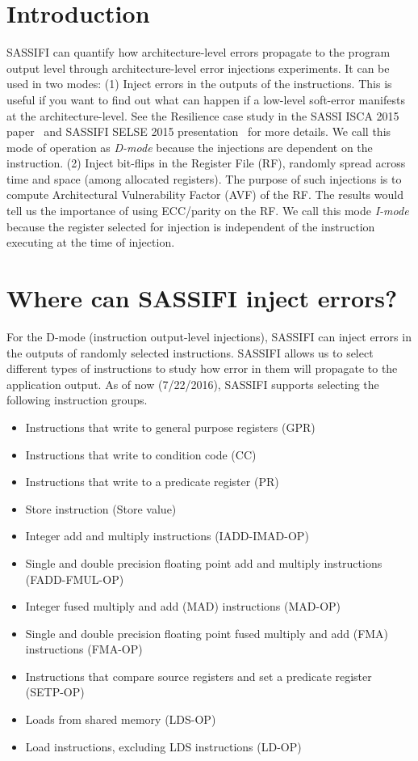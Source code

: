 \section{Introduction}
\label{sec:intro}

SASSIFI can quantify how architecture-level errors propagate to the program
output level through architecture-level error injections experiments. It can be
used in two modes: (1) Inject errors in the outputs of the instructions. This
is useful if you want to find out what can happen if a low-level soft-error
manifests at the architecture-level. See the Resilience case study in the SASSI
ISCA 2015 paper~\cite{SASSI_ISCA} and SASSIFI SELSE 2015
presentation~\cite{SASSIFI_SELSE} for more details. We call this mode of
operation as {\it D-mode} because the injections are dependent on the
instruction. (2) Inject bit-flips in the Register File (RF), randomly spread
across time and space (among allocated registers). The purpose of such
injections is to compute Architectural Vulnerability Factor (AVF) of the RF.
The results would tell us the importance of using ECC/parity on the RF.  We
call this mode {\it I-mode} because the register selected for injection is
independent of the instruction executing at the time of injection. 

\section{Where can SASSIFI inject errors?}
\label{sec:where}

For the D-mode (instruction output-level injections), SASSIFI can inject
errors in the outputs of randomly selected instructions. SASSIFI allows us to
select different types of instructions to study how error in them will
propagate to the application output. As of now (7/22/2016), SASSIFI supports
selecting the following instruction groups. 
\begin{itemize}
\item Instructions that write to general purpose registers (GPR) 
\item Instructions that write to condition code (CC) 
\item Instructions that write to a predicate register (PR) 
\item Store instruction (Store value) 
\item Integer add and multiply instructions (IADD-IMAD-OP)
\item Single and double precision floating point add and multiply instructions (FADD-FMUL-OP)
\item Integer fused multiply and add (MAD) instructions (MAD-OP)
\item Single and double precision floating point fused multiply and add (FMA) instructions  (FMA-OP)
\item Instructions that compare source registers and set a predicate register (SETP-OP)
\item Loads from shared memory (LDS-OP)
\item Load instructions, excluding LDS instructions (LD-OP)
\end{itemize}

